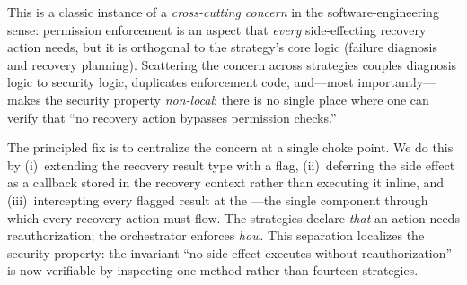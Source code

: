 This is a classic instance of a \emph{cross-cutting concern} in the software-engineering sense: permission enforcement is an aspect that \emph{every} side-effecting recovery action needs, but it is orthogonal to the strategy's core logic (failure diagnosis and recovery planning). Scattering the concern across strategies couples diagnosis logic to security logic, duplicates enforcement code, and---most importantly---makes the security property \emph{non-local}: there is no single place where one can verify that ``no recovery action bypasses permission checks.''

The principled fix is to centralize the concern at a single choke point. We do this by (i)~extending the recovery result type with a  flag, (ii)~deferring the side effect as a callback stored in the recovery context rather than executing it inline, and (iii)~intercepting every flagged result at the ---the single component through which every recovery action must flow. The strategies declare \emph{that} an action needs reauthorization; the orchestrator enforces \emph{how}. This separation localizes the security property: the invariant ``no side effect executes without reauthorization'' is now verifiable by inspecting one method rather than fourteen strategies.

